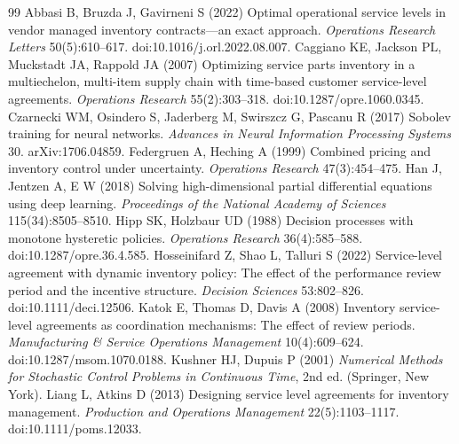 \begin{thebibliography}{99}
Abbasi B, Bruzda J, Gavirneni S (2022) Optimal operational service levels in vendor managed inventory contracts---an exact approach. \emph{Operations Research Letters} 50(5):610--617. doi:10.1016/j.orl.2022.08.007.
Caggiano KE, Jackson PL, Muckstadt JA, Rappold JA (2007) Optimizing service parts inventory in a multiechelon, multi-item supply chain with time-based customer service-level agreements. \emph{Operations Research} 55(2):303--318. doi:10.1287/opre.1060.0345.
Czarnecki WM, Osindero S, Jaderberg M, Swirszcz G, Pascanu R (2017) Sobolev training for neural networks. \emph{Advances in Neural Information Processing Systems} 30. arXiv:1706.04859.
Federgruen A, Heching A (1999) Combined pricing and inventory control under uncertainty. \emph{Operations Research} 47(3):454--475.
Han J, Jentzen A, E W (2018) Solving high-dimensional partial differential equations using deep learning. \emph{Proceedings of the National Academy of Sciences} 115(34):8505--8510.
Hipp SK, Holzbaur UD (1988) Decision processes with monotone hysteretic policies. \emph{Operations Research} 36(4):585--588. doi:10.1287/opre.36.4.585.
Hosseinifard Z, Shao L, Talluri S (2022) Service-level agreement with dynamic inventory policy: The effect of the performance review period and the incentive structure. \emph{Decision Sciences} 53:802--826. doi:10.1111/deci.12506.
Katok E, Thomas D, Davis A (2008) Inventory service-level agreements as coordination mechanisms: The effect of review periods. \emph{Manufacturing \& Service Operations Management} 10(4):609--624. doi:10.1287/msom.1070.0188.
Kushner HJ, Dupuis P (2001) \emph{Numerical Methods for Stochastic Control Problems in Continuous Time}, 2nd ed. (Springer, New York).
Liang L, Atkins D (2013) Designing service level agreements for inventory management. \emph{Production and Operations Management} 22(5):1103--1117. doi:10.1111/poms.12033.

\end{thebibliography}
